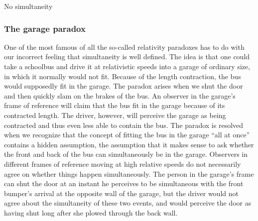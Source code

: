 \begin{envsubsection}{No simultaneity}
\subsubsection{The garage paradox}
One of the most famous of all the so-called relativity
paradoxes has to do with our incorrect 
feeling that simultaneity is well defined. The idea is that
one could take a schoolbus and drive it at relativistic
speeds into a garage of ordinary size, in which it normally
would not fit. Because of the length contraction, the bus
would supposedly fit in the garage. The paradox arises when
we shut the door and then quickly slam on the brakes of the
bus. An observer in the garage's frame of reference will
claim that the bus fit in the garage because of its
contracted length. The driver, however, will perceive the
garage as being contracted and thus even less able to
contain the bus. The paradox is
resolved when we recognize that the concept of fitting the
bus in the garage ``all at once'' contains a hidden
assumption, the assumption that it makes sense to ask
whether the front and back of the bus can simultaneously be
in the garage. Observers in different frames of reference
moving at high relative speeds do not necessarily agree on
whether things happen simultaneously. The person in the
garage's frame can shut the door at an instant he perceives
to be simultaneous with the front bumper's arrival at the
opposite wall of the garage, but the driver would not agree
about the simultaneity of these two events, and would
perceive the door as having shut long after she plowed
through the back wall.


\end{envsubsection}
%
